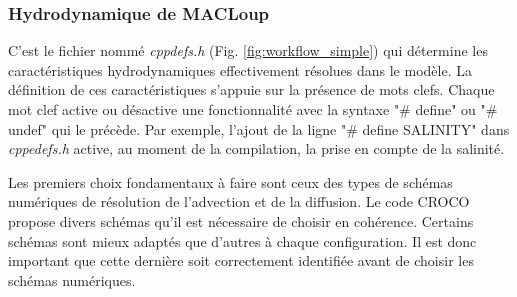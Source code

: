 \documentclass[10pt,a4paper,titlepage]{article}
\begin{document}
    
    \subsubsection{Hydrodynamique de MACLoup}
    \label{subsub:pysique_modele}
    C'est le fichier nommé \textit{cppdefs.h} (Fig. \ref{fig:workflow_simple}) qui détermine les caractéristiques hydrodynamiques effectivement résolues dans le modèle.
    La définition de ces caractéristiques s'appuie sur la présence de mots clefs.
    Chaque mot clef active ou désactive une fonctionnalité avec la syntaxe "\# define"  ou "\# undef" qui le précède.
    Par exemple, l'ajout de la ligne "\# define SALINITY" dans \textit{cppedefs.h} active, au moment de la compilation, la prise en compte de la salinité.
    
    
    
    Les premiers choix fondamentaux à faire sont ceux des types de schémas numériques de résolution de l'advection et de la diffusion.
    Le code CROCO propose divers schémas qu'il est nécessaire de choisir en cohérence. %
    Certains schémas sont mieux adaptés que d'autres à chaque configuration.
    Il est donc important que cette dernière soit correctement identifiée avant de choisir les schémas numériques.
    
\end{document}
